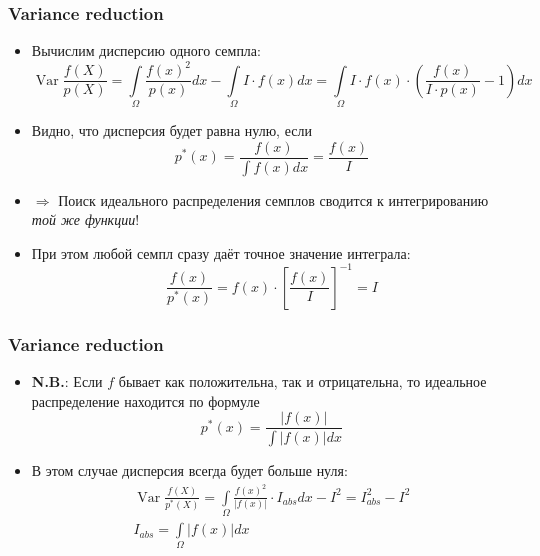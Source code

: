\documentclass[10pt]{beamer}
\begin{document}
\begin{frame}
\frametitle{Variance reduction}
\begin{itemize}
\item Вычислим дисперсию одного семпла:
\begin{equation*}
\operatorname{Var}\frac{f(X)}{p(X)} = \int\limits_\Omega \frac{f(x)^2}{p(x)}dx - \int\limits_\Omega I\cdot f(x)dx = \int\limits_\Omega I\cdot f(x)\cdot\left(\frac{f(x)}{I\cdot p(x)} - 1\right)dx
\end{equation*}
\pause
\item Видно, что дисперсия будет равна нулю, если
\begin{equation*}
p^*(x) = \frac{f(x)}{\int f(x)dx} = \frac{f(x)}{I}
\end{equation*}
\pause
\item \begin{math}\Longrightarrow\end{math} Поиск идеального распределения семплов сводится к интегрированию \textit{той же функции}!
\pause
\item При этом любой семпл сразу даёт точное значение интеграла:
\begin{equation*}
\frac{f(x)}{p^*(x)} = f(x) \cdot \left[\frac{f(x)}{I}\right]^{-1} = I
\end{equation*}
\end{itemize}
\end{frame}

\begin{frame}
\frametitle{Variance reduction}
\begin{itemize}
\item \alert{\textbf{N.B.}}: Если \begin{math}f\end{math} бывает как положительна, так и отрицательна, то идеальное распределение находится по формуле
\begin{equation*}
p^*(x) = \frac{|f(x)|}{\int |f(x)|dx}
\end{equation*}
\pause
\item В этом случае дисперсия всегда будет больше нуля:
\begin{gather*}
\operatorname{Var}\frac{f(X)}{p^*(X)} = \int\limits_\Omega \frac{f(x)^2}{|f(x)|}\cdot I_{abs} dx - I^2 = I_{abs}^2 - I^2 \\
I_{abs} = \int\limits_\Omega |f(x)|dx
\end{gather*}
\end{itemize}
\end{frame}
\end{document}
